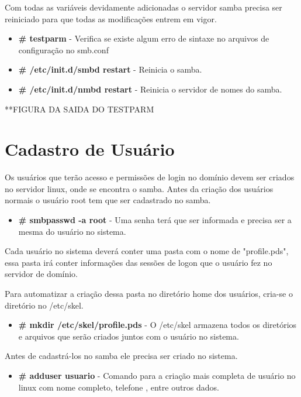 Com todas as variáveis devidamente adicionadas o servidor samba precisa ser reiniciado para que todas as modificações entrem em vigor.

\begin{itemize}
	\item \textbf{\# testparm} - Verifica se existe algum erro de sintaxe no arquivos de configuração no smb.conf
	\item \textbf{\# /etc/init.d/smbd restart} - Reinicia o samba.
	\item \textbf{\# /etc/init.d/nmbd restart} - Reinicia o servidor de nomes do samba.
\end{itemize}

**FIGURA DA SAIDA DO TESTPARM

\section{Cadastro de Usuário}

Os usuários que terão acesso e permissões de login no domínio devem ser criados no servidor linux, onde se encontra o samba. Antes da criação dos usuários normais o usuário root tem que ser cadastrado no samba.

\begin{itemize}
	\item \textbf {\# smbpasswd -a root} - Uma senha terá que ser informada e precisa ser a mesma do usuário no sistema.
\end{itemize}

Cada usuário no sistema deverá conter uma pasta com o nome de "profile.pds", essa pasta irá conter informações das sessões de logon que o usuário fez no servidor de domínio.

Para automatizar a criação dessa pasta no diretório home dos usuários, cria-se o diretório no /etc/skel.

\begin{itemize}
	\item \textbf{\# mkdir /etc/skel/profile.pds} - O /etc/skel armazena todos os diretórios e arquivos que serão criados juntos com o usuário no sistema.
\end{itemize}

Antes de cadastrá-los no samba ele precisa ser criado no sistema.

\begin{itemize}
	\item \textbf{\# adduser usuario} - Comando para a criação mais completa de usuário no linux com nome completo, telefone , entre outros dados.
\end{itemize}

